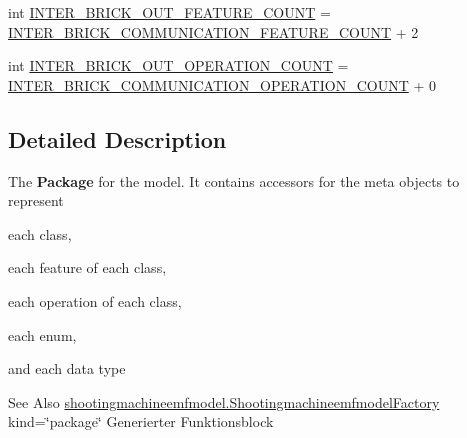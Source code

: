 \begin{DoxyCompactItemize}
\item 
int \hyperlink{interfaceshootingmachineemfmodel_1_1_shootingmachineemfmodel_package_a49923f0136dcd79cec1e3f6f7a9c31c3}{I\-N\-T\-E\-R\-\_\-\-B\-R\-I\-C\-K\-\_\-\-O\-U\-T\-\_\-\-F\-E\-A\-T\-U\-R\-E\-\_\-\-C\-O\-U\-N\-T} = \hyperlink{interfaceshootingmachineemfmodel_1_1_shootingmachineemfmodel_package_a8d13017baf2c20e1387a03aa9657d5ff}{I\-N\-T\-E\-R\-\_\-\-B\-R\-I\-C\-K\-\_\-\-C\-O\-M\-M\-U\-N\-I\-C\-A\-T\-I\-O\-N\-\_\-\-F\-E\-A\-T\-U\-R\-E\-\_\-\-C\-O\-U\-N\-T} + 2
\item 
int \hyperlink{interfaceshootingmachineemfmodel_1_1_shootingmachineemfmodel_package_a408e126ab2ebdaf8e342306d21ec4ec9}{I\-N\-T\-E\-R\-\_\-\-B\-R\-I\-C\-K\-\_\-\-O\-U\-T\-\_\-\-O\-P\-E\-R\-A\-T\-I\-O\-N\-\_\-\-C\-O\-U\-N\-T} = \hyperlink{interfaceshootingmachineemfmodel_1_1_shootingmachineemfmodel_package_afd388b80427475bafc3ae00abc93859e}{I\-N\-T\-E\-R\-\_\-\-B\-R\-I\-C\-K\-\_\-\-C\-O\-M\-M\-U\-N\-I\-C\-A\-T\-I\-O\-N\-\_\-\-O\-P\-E\-R\-A\-T\-I\-O\-N\-\_\-\-C\-O\-U\-N\-T} + 0
\end{DoxyCompactItemize}


\subsection{Detailed Description}
The {\bfseries Package} for the model. It contains accessors for the meta objects to represent 
\begin{DoxyItemize}
\item each class, 
\item each feature of each class, 
\item each operation of each class, 
\item each enum, 
\item and each data type 
\end{DoxyItemize}

\begin{DoxySeeAlso}{See Also}
\hyperlink{interfaceshootingmachineemfmodel_1_1_shootingmachineemfmodel_factory}{shootingmachineemfmodel.\-Shootingmachineemfmodel\-Factory}  kind=\char`\"{}package\char`\"{} Generierter Funktionsblock 
\end{DoxySeeAlso}


